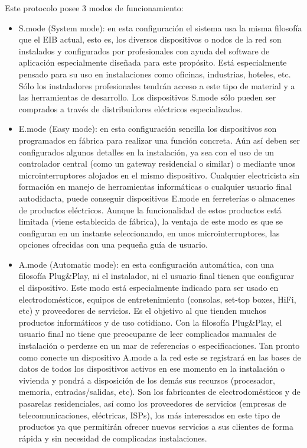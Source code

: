 Este protocolo posee 3 modos de funcionamiento:
\begin{itemize}
\item S.mode (System mode): en esta configuración el sistema usa la misma filosofía que el EIB actual, esto es, los diversos dispositivos o nodos de la red son instalados y configurados por profesionales con ayuda del software de aplicación especialmente diseñada para este propósito. Está especialmente pensado para su uso en instalaciones como oficinas, industrias, hoteles, etc. Sólo los instaladores profesionales tendrán acceso a este tipo de material y a las herramientas de desarrollo. Los dispositivos S.mode sólo pueden ser comprados a través de distribuidores eléctricos especializados.
\item E.mode (Easy mode): en esta configuración sencilla los dispositivos son programados en fábrica para realizar una función concreta. Aún así deben ser configurados algunos detalles en la instalación, ya sea con el uso de un controlador central (como un gateway residencial o similar) o mediante unos microinterruptores alojados en el mismo dispositivo. Cualquier electricista sin formación en manejo de herramientas informáticas o cualquier usuario final autodidacta, puede conseguir dispositivos E.mode en ferreterías o almacenes de productos eléctricos. Aunque la funcionalidad de estos productos está limitada (viene establecida de fábrica), la ventaja de este modo es que se configuran en un instante seleccionando, en unos microinterruptores, las opciones ofrecidas con una pequeña guía de usuario. 
\item  A.mode (Automatic mode): en esta configuración automática, con una filosofía Plug\&Play, ni el instalador, ni el usuario final tienen que configurar el dispositivo. Este modo está especialmente indicado para ser usado en electrodomésticos, equipos de entretenimiento (consolas, set-top boxes, HiFi, etc) y proveedores de servicios. Es el objetivo al que tienden muchos productos informáticos y de uso cotidiano. Con la filosofía Plug\&Play, el usuario final no tiene que preocuparse de leer complicados manuales de instalación o perderse en un mar de referencias o especificaciones. Tan pronto como conecte un dispositivo A.mode a la red este se registrará en las bases de datos de todos los dispositivos activos en ese momento en la instalación o vivienda y pondrá a disposición de los demás sus recursos (procesador, memoria, entradas/salidas, etc). Son los fabricantes de electrodomésticos y de pasarelas residenciales, así como los proveedores de servicios (empresas de telecomunicaciones, eléctricas, ISPs), los más interesados en este tipo de productos ya que permitirán ofrecer nuevos servicios a sus clientes de forma rápida y sin necesidad de complicadas instalaciones.
\end{itemize}

